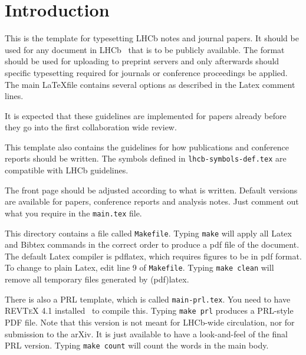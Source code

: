 \section{Introduction}
\label{sec:Introduction}
 
This is the template for typesetting LHCb notes and journal papers.
It should be used for any document in LHCb~\cite{Alves:2008zz} that is to be
publicly available. The format should be used for uploading to
preprint servers and only afterwards should specific typesetting
required for journals or conference proceedings be applied. The main
\LaTeX file contains several options as described in the Latex comment
lines.
 
It is expected that these guidelines are implemented for papers already
before they go into the first collaboration wide review.
 
This template also contains the guidelines for how publications and
conference reports should be written.
The symbols defined in \texttt{lhcb-symbols-def.tex} are compatible with
LHCb guidelines.
 
The front page should be adjusted according to what is
written. Default versions are available for papers, conference reports
and analysis notes. Just comment out what you require in the
\texttt{main.tex} file.
 
This directory contains a file called \texttt{Makefile}.
Typing \texttt{make} will apply all Latex and Bibtex commands
in the correct order to produce a pdf file of the document.
The default Latex compiler is pdflatex, which requires figures
to be in pdf format.
To change to plain Latex, edit line 9 of \texttt{Makefile}.
Typing \texttt{make clean} will remove all temporary files generated by (pdf)latex.
 
There is also a PRL template, which is called \texttt{main-prl.tex}.  You need
to have \textsc{REVTeX 4.1} installed~\cite{REVTeX} to compile this. Typing
\texttt{make prl} produces a PRL-style PDF file. Note that this version is not
meant for LHCb-wide circulation, nor for submission to the arXiv. It is just
available to have a look-and-feel of the final PRL version. Typing \texttt{make
 count} will count the words in the main body.
 
%
%

